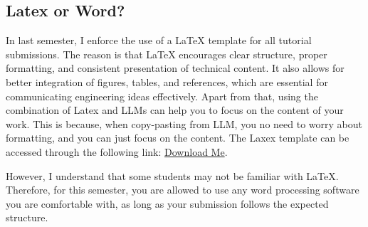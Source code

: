 \subsection{Latex or Word?}
In last semester, I enforce the use of a LaTeX template for all tutorial submissions. The reason is that LaTeX encourages clear structure, proper formatting, and consistent presentation of technical content. It also allows for better integration of figures, tables, and references, which are essential for communicating engineering ideas effectively. Apart from that, using the combination of Latex and LLMs can help you to focus on the content of your work. This is because, when copy-pasting from LLM, you no need to worry about formatting, and you can just focus on the content. The Laxex template can be accessed through the following link: \href{https://itel.ums.edu.my/mod/resource/view.php?id=968033}{Download Me}.

However, I understand that some students may not be familiar with LaTeX. Therefore, for this semester, you are allowed to use any word processing software you are comfortable with, as long as your submission follows the expected structure.
